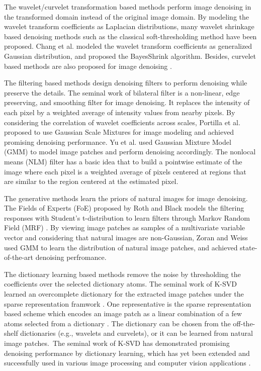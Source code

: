 The wavelet/curvelet transformation based methods perform image denoising in the transformed domain instead of the original image domain. By modeling the wavelet transform coefficients as Laplacian distributions, many wavelet shrinkage based denoising methods such as the classical soft-thresholding method \cite{softthresholding} have been proposed. Chang et al. modeled the wavelet transform coefficients as generalized Gaussian distribution, and proposed the BayesShrink \cite{bayesshrink} algorithm. Besides, curvelet based methods are also proposed for image denoising \cite{curvelet}.

The filtering based methods design denoising filters to perform denoising while preserve the details. The seminal work of bilateral filter \cite{Tomasi1998} is a non-linear, edge preserving, and smoothing filter for image denoising. It replaces the intensity of each pixel by a weighted average of intensity values from nearby pixels. By considering the correlation of wavelet coefficients across scales, Portilla et al. \cite{blsgsm} proposed to use Gaussian Scale Mixtures for image modeling and achieved promising denoising performance. Yu et al. \cite{ple} used Gaussian Mixture Model (GMM) to model image patches and perform denoising accordingly. The nonlocal means (NLM) filter \cite{nlm} has a basic idea that to build a pointwise estimate of the image where each pixel is a weighted average of pixels centered at regions that are similar to the region centered at the estimated pixel.

The generative methods learn the priors of natural images for image denoising. The Fields of Experts (FoE) \cite{foe} proposed by Roth and Black models the filtering responses with Student's t-distribution to learn filters through Markov Random Field (MRF) \cite{Bishop}. By viewing image patches as samples of a multivariate variable vector and considering that natural images are non-Gaussian, Zoran and Weiss \cite{epll,gmmnips} used GMM to learn the distribution of natural image patches, and achieved state-of-the-art denoising perfromance.

The dictionary learning based methods remove the noise by thresholding the coefficients over the selected dictionary atoms. The seminal work of K-SVD \cite{ksvd} learned an overcomplete dictionary for the extracted image patches under the sparse representation framwork \cite{olshausen1997sparse,olshausen1996emergence}. One representative is the sparse representation based scheme which encodes an image patch as a linear combination of a few atoms selected from a dictionary \cite{olshausen1996emergence,olshausen1997sparse,ksvd}. The dictionary can be chosen from the off-the-shelf dictionaries (e.g., wavelets and curvelets), or it can be learned from natural image patches.\ The seminal work of K-SVD \cite{ksvdtsp,ksvd} has demonstrated promising denoising performance by dictionary learning, which has yet been extended and successfully used in various image processing and computer vision applications \cite{srcolor,srcvpr,lcksvd,onlinedl}.

